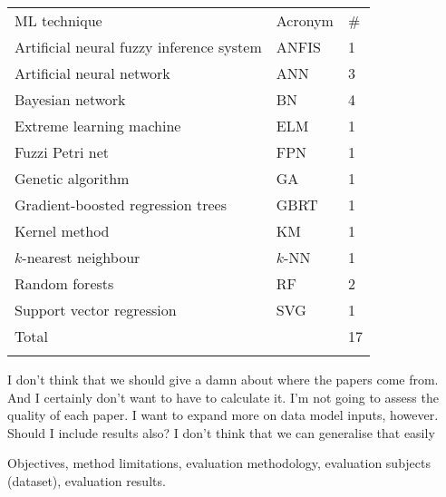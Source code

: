 \documentclass{article}
\begin{document}
\begin{table}[h]
\begin{tabular}{lll}
\noalign{\smallskip}\hline \noalign{\smallskip}
ML technique                             & Acronym & \# \\ 	\noalign{\smallskip}\hline \noalign{\smallskip}
Artificial neural fuzzy inference system & ANFIS   & 1  \\
Artificial neural network               & ANN     & 3  \\
Bayesian network                       & BN      & 4  \\
Extreme learning machine                & ELM     & 1  \\
Fuzzi Petri net                          & FPN     & 1  \\
Genetic algorithm                        & GA      & 1  \\
Gradient-boosted regression trees        & GBRT    & 1  \\
Kernel method                           & KM      & 1  \\
$k$-nearest neighbour                    & $k$-NN  & 1  \\
Random forests                           & RF      & 2  \\
Support vector regression                & SVG     & 1  \\ 	\noalign{\smallskip}
Total                                    &         & 17	\\ \noalign{\smallskip} \hline
\end{tabular}
\end{table}

I don't think that we should give a damn about where the papers come from.
And I certainly don't want to have to calculate it.
I'm not going to assess the quality of each paper. 
I want to expand more on data model inputs, however. 
Should I include results also?
I don't think that we can generalise that easily

Objectives, method limitations, evaluation methodology, evaluation subjects (dataset), evaluation results. 



\clearpage
\onecolumn

\printbibliography
 
\end{document}
